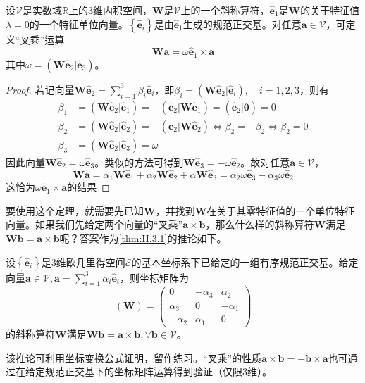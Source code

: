 \documentclass[../main.tex]{subfiles}
\begin{document}
\begin{theorem}\label{thm:II.3.1}
    设$\mathcal{V}$是实数域$\mathbb{R}$上的3维内积空间，$\mathbf{W}$是$\mathcal{V}$上的一个斜称算符，$\mathbf{\hat{e}}_1$是$\mathbf{W}$的关于特征值$\lambda=0$的一个特征单位向量。$\left\{\mathbf{\hat{e}}_i\right\}$是由$\mathbf{\hat{e}}_1$生成的规范正交基。对任意$\mathbf{a}\in\mathcal{V}$，可定义“叉乘”运算
    \[\mathbf{Wa}=\omega\mathbf{\hat{e}}_1\times\mathbf{a}\]
    其中$\omega=\left(\mathbf{W\hat{e}}_2|\mathbf{\hat{e}}_3\right)$。
\end{theorem}
\begin{proof}
    若记向量$\mathbf{W\hat{e}}_2=\sum_{i=1}^3\beta_i\mathbf{\hat{e}}_i$，即$\beta_i=\left(\mathbf{W\hat{e}}_2|\mathbf{\hat{e}}_i\right),\quad i=1,2,3$，则有
    \begin{align*}
        \beta_1 & =\left(\mathbf{W\hat{e}}_2|\mathbf{\hat{e}}_1\right)=-\left(\mathbf{\hat{e}}_2|\mathbf{W\hat{e}}_1\right)=\left(\mathbf{\hat{e}}_2|\mathbf{0}\right)=0     \\
        \beta_2 & =\left(\mathbf{W\hat{e}}_2|\mathbf{\hat{e}}_2\right)=-\left(\mathbf{e}_2|\mathbf{W\hat{e}}_2\right)\Leftrightarrow\beta_2=-\beta_2\Leftrightarrow\beta_2=0 \\
        \beta_3 & =\left(\mathbf{W\hat{e}}_2|\mathbf{\hat{e}}_3\right)=\omega
    \end{align*}
    因此向量$\mathbf{W\hat{e}}_2=\omega\mathbf{\hat{e}}_3$。类似的方法可得到$\mathbf{W\hat{e}}_3=-\omega\mathbf{\hat{e}}_2$。故对任意$\mathbf{a}\in\mathcal{V}$，
    \[
        \mathbf{Wa}=\alpha_1\mathbf{W\hat{e}}_1+\alpha_2\mathbf{W\hat{e}}_2+\alpha\mathbf{W\hat{e}}_3=\alpha_2\omega\mathbf{\hat{e}}_3-\alpha_3\omega\mathbf{\hat{e}}_2
    \]
    这恰为$\omega\mathbf{\hat{e}}_1\times\mathbf{a}$的结果
\end{proof}
要使用这个定理，就需要先已知$\mathbf{W}$，并找到$\mathbf{W}$在关于其零特征值的一个单位特征向量。如果我们先给定两个向量的“叉乘”$\mathbf{a}\times\mathbf{b}$，那么什么样的斜称算符$\mathbf{W}$满足$\mathbf{Wb}=\mathbf{a}\times\mathbf{b}$呢？答案作为\ref{thm:II.3.1}的推论如下。

\begin{corollary}
    设$\left\{\mathbf{\hat{e}}_i\right\}$是3维欧几里得空间$\mathcal{E}$的基本坐标系下已给定的一组有序规范正交基。给定向量$\mathbf{a}\in\mathcal{V},\mathbf{a}=\sum_{i=1}^3\alpha_i\mathbf{\hat{e}}_i$，则坐标矩阵为
    \[\left(\mathbf{W}\right)=\left(\begin{array}{ccc}0&-\alpha_3&\alpha_2\\\alpha_3&0&-\alpha_1\\-\alpha_2&\alpha_1&0\end{array}\right)\]
    的斜称算符$\mathbf{W}$满足$\mathbf{Wb}=\mathbf{a}\times\mathbf{b},\forall\mathbf{b}\in\mathcal{V}$。
\end{corollary}
该推论可利用坐标变换公式证明，留作练习。“叉乘”的性质$\mathbf{a}\times\mathbf{b}=-\mathbf{b}\times\mathbf{a}$也可通过在给定规范正交基下的坐标矩阵运算得到验证（仅限3维）。
\end{document}
